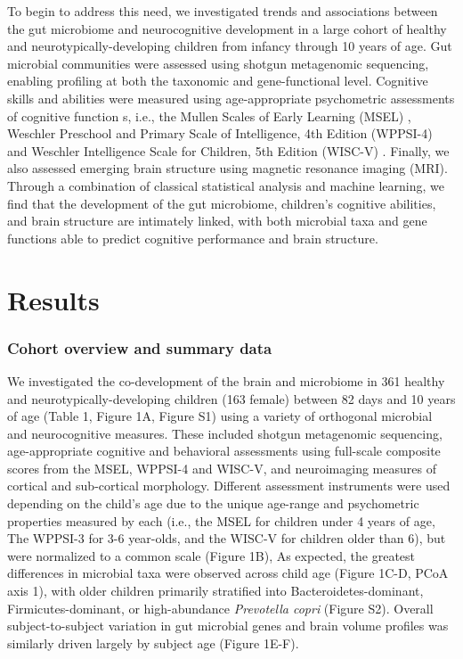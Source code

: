 \documentclass{article}
\begin{document}
To begin to address this need, we investigated trends and associations between
the gut microbiome and
neurocognitive development in a large cohort of healthy and neurotypically-developing
children from infancy through 10 years of age. Gut microbial
communities were assessed using shotgun metagenomic sequencing, enabling
profiling at both the taxonomic and gene-functional level.
Cognitive skills and abilities were measured using age-appropriate
psychometric assessments of cognitive function s, i.e.,
the Mullen Scales of Early Learning (MSEL) \cite{mullenMullenScalesEarly1995},
Weschler Preschool and Primary Scale of Intelligence, 4th Edition (WPPSI-4) 
\cite{wechslerWechslerPreschoolPrimary2012}
and Weschler Intelligence Scale for Children, 5th Edition (WISC-V)
\cite{wechslerWechslerIntelligenceScale1949}.
Finally, we also assessed emerging brain structure using magnetic resonance imaging
(MRI). Through a combination of classical statistical analysis and machine
learning, we find that the development of the gut microbiome,
children's cognitive abilities, and brain structure are intimately linked, with
both microbial taxa and gene functions able to predict cognitive
performance and brain structure.

\section*{Results}

\subsubsection*{Cohort overview and summary data}

We investigated the co-development of the brain and microbiome in
361 healthy and neurotypically-developing children (163 female) between 82 days and 10 years of age
(Table 1,  Figure 1A, Figure S1)
using a variety of orthogonal microbial and neurocognitive measures.
These included shotgun metagenomic sequencing,
age-appropriate cognitive and behavioral assessments
using full-scale composite scores from the MSEL, WPPSI-4 and WISC-V,
and neuroimaging measures of cortical and sub-cortical morphology. 
Different assessment instruments were used depending on the child's age
due to the unique age-range and psychometric properties measured by each
(i.e., the MSEL for children under 4 years of age, The WPPSI-3 for 3-6 year-olds,
and the WISC-V for children older than 6), but were normalized to a common scale (Figure 1B),
As expected, the greatest differences in microbial taxa were observed across
child age (Figure 1C-D, PCoA axis 1), with older children primarily
stratified into Bacteroidetes-dominant, Firmicutes-dominant, or
high-abundance \emph{Prevotella copri} (Figure S2).
Overall subject-to-subject variation in gut microbial genes
and brain volume profiles was similarly driven largely by subject age (Figure 1E-F).
\end{document}
